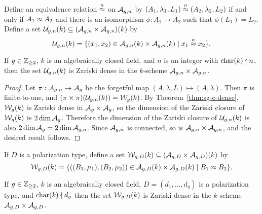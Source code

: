 \documentclass{amsart}
\begin{document}
 Define an equivalence relation $\stackrel{n}{\approx}$ on $\mathcal{A}_{g,n}$ by $(A_1, \lambda_1, L_1) \stackrel{n}{\approx} (A_2, \lambda_2, L_2)$ if and only if $A_1 \approx A_2$ and there is an isomorphism $\phi: A_1 \to A_2$ such that $\phi(L_1) = L_2$. %
 Define a set $\mathcal{U}_{g,n}(k)  \subseteq (\mathcal{A}_{g,n} \times \mathcal{A}_{g,n})(k)$ by
\[
\mg(k) =  \{(x_1,x_2) \in \agn(k) \times \agn(k) \mid x_1 \medium x_2 \}. %
\]
\begin{proposition}\label{prop:medium-isomorphic}
  If $g\in\mathbb{Z}_{\ge 2}$, %
  $k$ is an algebraically closed field, and $n$ is an integer with $\operatorname{char}(k) \nmid n$, %
  then the set $\mathcal{U}_{g,n}(k)$
  is Zariski dense in the $k$-scheme $\mathcal{A}_{g,n} \times \mathcal{A}_{g,n}$.
\end{proposition}

\begin{proof}
  Let $\pi: \mathcal{A}_{g,n} \to \mathcal{A}_g$ be the forgetful map $(A,\lambda,L) \mapsto (A,\lambda)$. Then $\pi$ is finite-to-one, and $(\pi\times\pi)(\mathcal{U}_{g,n}(k)) = \mathcal{W}_g(k)$. By Theorem~\ref{thm:sg-c-dense}, $\mathcal{W}_g(k)$ is Zariski dense in $\mathcal{A}_g \times \mathcal{A}_g$, so the dimension of the Zariski closure of $\mathcal{W}_g(k)$ is $2 \dim \mathcal{A}_g$. Therefore the dimension of the Zariski closure of $\mathcal{U}_{g,n}(k)$ is also $2 \dim \mathcal{A}_g = 2 \dim \mathcal{A}_{g,n}$. Since $\mathcal{A}_{g,n}$ is connected, so is $\mathcal{A}_{g,n} \times \mathcal{A}_{g,n}$, and the desired result follows.
\end{proof}

If $D$ is a polarization type, define a set $\mathcal{W}_{g,D}(k)  \subseteq (\mathcal{A}_{g,{D}} \times \mathcal{A}_{g,{D}})(k)$ by
\[
\mathcal{W}_{g,D}(k) =  \{((B_1,\mu_1), (B_2, \mu_2)) \in \mathcal{A}_{g,{D}}(k) \times \mathcal{A}_{g,{D}}(k) \mid B_1 \approx B_2 \}.
\]

\begin{proposition}
\label{prop:whatever}
  If $g\in\mathbb{Z}_{\ge 2}$, %
  $k$ is an algebraically closed field, $D=(d_1,\ldots,d_g)$ is a polarization type, and $\operatorname{char}(k) \nmid d_g$ %
  then the set $\mathcal{W}_{g,D}(k)$
is Zariski dense in the $k$-scheme $\mathcal{A}_{g,{D}} \times \mathcal{A}_{g,{D}}$.
\end{proposition}
\end{document}
